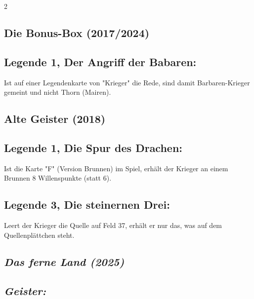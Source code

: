 \documentclass[10pt, a4paper, oneside]{book}
\newcommand{\fan}[1]{\textit{#1}}
\begin{document}
\begin{multicols*}{2}
\begin{bgcolor}[color-BB]
\section{Die Bonus-Box (2017/2024)}

\subsection{Legende 1, Der Angriff der Babaren:}

Ist auf einer Legendenkarte von "Krieger" die Rede, sind damit Barbaren-Krieger gemeint und nicht Thorn (Mairen).
\supercite{BB1:A}

\end{bgcolor}





\begin{bgcolor}[color-AG]
\section{Alte Geister (2018)}



\subsection{Legende 1, Die Spur des Drachen:}

Ist die Karte "F" (Version Brunnen) im Spiel, erhält der Krieger an einem Brunnen 8 Willenspunkte (statt 6).
\supercite{AG1:F_Brunnen}


\subsection{Legende 3, Die steinernen Drei:}

Leert der Krieger die Quelle auf Feld 37, erhält er nur das, was auf dem Quellenplättchen steht.
\supercite{AG:Begleitheft}

\end{bgcolor}






\begin{bgcolor}
\section{\fan{Das ferne Land (2025)}}

\subsection{\fan{Geister:}}


\end{bgcolor}
\end{multicols*}
\end{document}
